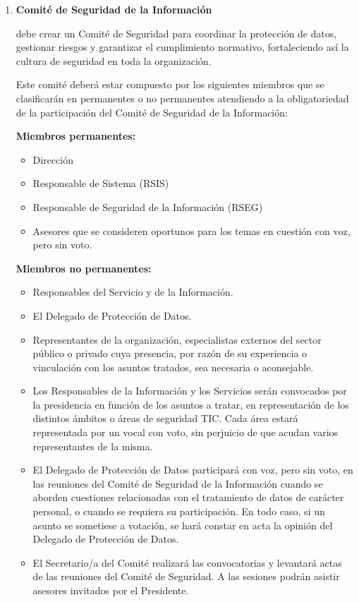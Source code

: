 \begin{enumerate}[label=\alph*)]
\item \textbf{Comit\'e de Seguridad de la Informaci\'on}

\Beneficiario{} debe crear un Comit\'e de Seguridad para coordinar la protecci\'on de datos, gestionar riesgos y garantizar el cumplimiento normativo, fortaleciendo as\'i la cultura de seguridad en toda la organizaci\'on.

Este comit\'e deber\'a estar compuesto por los siguientes miembros que se clasificar\'an en permanentes o no permanentes atendiendo a la obligatoriedad de la participaci\'on del Comit\'e de Seguridad de la Informaci\'on:

\textbf{Miembros permanentes:}
\begin{itemize}
  \item Direcci\'on
  \item Responsable de Sistema (RSIS)
  \item Responsable de Seguridad de la Informaci\'on (RSEG)
  \item Asesores que se consideren oportunos para los temas en cuesti\'on con voz, pero sin voto.
\end{itemize}

\textbf{Miembros no permanentes:}
\begin{itemize}
  \item Responsables del Servicio y de la Informaci\'on.
  \item El Delegado de Protecci\'on de Datos.
  \item Representantes de la organizaci\'on, especialistas externos del sector p\'ublico o privado cuya presencia, por raz\'on de su experiencia o vinculaci\'on con los asuntos tratados, sea necesaria o aconsejable.
  \item Los Responsables de la Informaci\'on y los Servicios ser\'an convocados por la presidencia en funci\'on de los asuntos a tratar, en representaci\'on de los distintos \'{a}mbitos o \'{a}reas de seguridad TIC. Cada \'{a}rea estar\'a representada por un vocal con voto, sin perjuicio de que acudan varios representantes de la misma.
  \item El Delegado de Protecci\'on de Datos participar\'a con voz, pero sin voto, en las reuniones del Comit\'e de Seguridad de la Informaci\'on cuando se aborden cuestiones relacionadas con el tratamiento de datos de car\'acter personal, o cuando se requiera su participaci\'on. En todo caso, si un asunto se sometiese a votaci\'on, se har\'a constar en acta la opini\'on del Delegado de Protecci\'on de Datos.
  \item El Secretario/a del Comit\'e realizar\'a las convocatorias y levantar\'a actas de las reuniones del Comit\'e de Seguridad. A las sesiones podr\'an asistir asesores invitados por el Presidente.
\end{itemize}


\end{enumerate}

